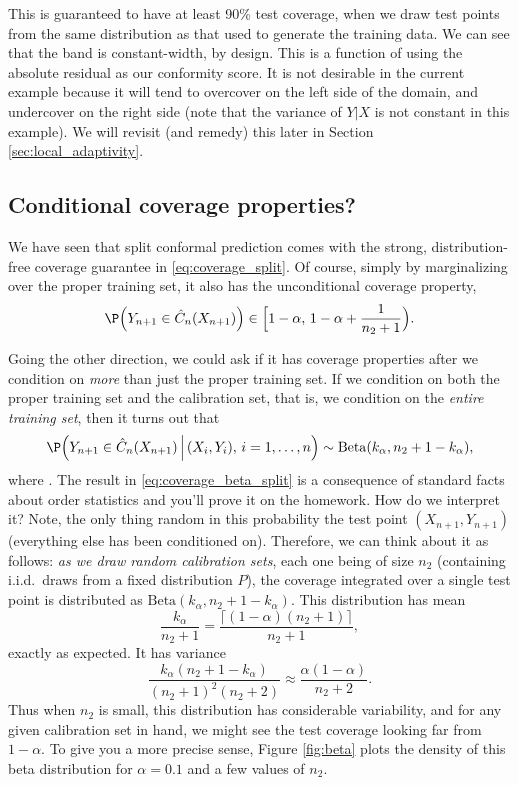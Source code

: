 \documentclass{article}
\begin{document}
This is guaranteed to have at least 90\% test coverage, when we draw test points
from the same distribution as that used to generate the training data. We can
see that the band is constant-width, by design. This is a function of using the
absolute residual as our conformity score. It is not desirable in the current
example because it will tend to overcover on the left side of the domain, and
undercover on the right side (note that the variance of $Y|X$ is not constant in
this example). We will revisit (and remedy) this later in Section
\ref{sec:local_adaptivity}.   

\subsection{Conditional coverage properties?}

We have seen that split conformal prediction comes with the strong,
distribution-free coverage guarantee in \eqref{eq:coverage_split}. Of course, 
simply by marginalizing over the proper training set, it also has the
unconditional coverage property, 
\[
\P\Big( Y_{n+1} \in \hC_n(X_{n+1}) \Big) \in
\Big[ 1-\alpha, \, 1-\alpha + \frac{1}{n_2+1} \Big).  
\]

Going the other direction, we could ask if it has coverage properties after we
condition on \emph{more} than just the proper training set. If we condition on
both the proper training set and the calibration set, that is, we condition on
the \emph{entire training set}, then it turns out that 
\begin{equation}
\label{eq:coverage_beta_split}
\P\Big(Y_{n+1} \in \hC_n(X_{n+1}) \, \Big| \, (X_i,Y_i), \, i=1,\dots,n \Big) 
\sim \mathrm{Beta}(k_\alpha, n_2+1-k_\alpha), 
\end{equation}
where . The result in
\eqref{eq:coverage_beta_split} is a consequence of standard facts about order
statistics and you'll prove it on the homework. How do we interpret it? Note,
the only thing random in this probability the test point $(X_{n+1},Y_{n+1})$
(everything else has been conditioned on). Therefore, we can think about it as
follows: \emph{as we draw random calibration sets}, each one being of size $n_2$ 
(containing i.i.d.\ draws from a fixed distribution $P$), the coverage
integrated over a single test point is distributed as $\mathrm{Beta}(k_\alpha,
n_2+1-k_\alpha)$. This distribution has mean   
\[
\frac{k_\alpha}{n_2+1} = \frac{\lceil (1-\alpha)(n_2+1) \rceil}{n_2+1},
\]
exactly as expected. It has variance
\[
\frac{k_\alpha (n_2+1-k_\alpha)}{(n_2+1)^2 (n_2+2)} \approx 
\frac{\alpha (1-\alpha)}{n_2+2}.
\]
Thus when $n_2$ is small, this distribution has considerable variability, and
for any given calibration set in hand, we might see the test coverage looking
far from $1-\alpha$. To give you a more precise sense, Figure \ref{fig:beta} 
plots the density of this beta distribution for $\alpha = 0.1$ and a few values 
of $n_2$.   
\end{document}

